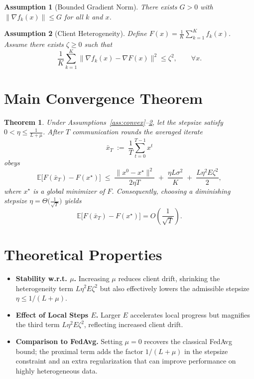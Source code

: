 \documentclass[11pt]{article}
\newtheorem{theorem}{Theorem}
\newtheorem{assumption}{Assumption}
\begin{document}
\begin{assumption}[Bounded Gradient Norm]\label{ass:boundgrad}
There exists $G>0$ with $\|\nabla f_k(x)\|\le G$ for all $k$ and $x$.
\end{assumption}

\begin{assumption}[Client Heterogeneity]\label{ass:hetero}
Define $F(x)=\frac{1}{K}\sum_{k=1}^{K}f_k(x)$. Assume there exists $\zeta\ge0$ such that
\[
    \frac{1}{K}\sum_{k=1}^{K}\|\nabla f_k(x)-\nabla F(x)\|^{2}\le\zeta^{2},\qquad\forall x.
\]
\end{assumption}

\section*{Main Convergence Theorem}
\begin{theorem}\label{thm:conv}
Under Assumptions~\ref{ass:convex}–\ref{ass:hetero}, let the stepsize satisfy $0<\eta\le\frac{1}{L+\mu}$. After $T$ communication rounds the averaged iterate
\[
    \bar{x}_{T}\;:=\;\frac{1}{T}\sum_{t=0}^{T-1}x^{t}
\]
obeys
\[
    \mathbb{E}\!\bigl[F(\bar{x}_{T})-F(x^{\star})\bigr]
    \;\le\;
    \frac{\|x^{0}-x^{\star}\|^{2}}{2\eta T}
    \;+\;
    \frac{\eta L\sigma^{2}}{K}
    \;+\;
    \frac{L\eta^{2}E\zeta^{2}}{2},
\]
where $x^{\star}$ is a global minimizer of $F$.
Consequently, choosing a diminishing stepsize $\eta=\Theta\!\bigl(\tfrac{1}{\sqrt{T}}\bigr)$ yields
\[
    \mathbb{E}\!\bigl[F(\bar{x}_{T})-F(x^{\star})\bigr]=
    O\!\left(\frac{1}{\sqrt{T}}\right).
\]
\end{theorem}

\section*{Theoretical Properties}
\begin{itemize}
    \item \textbf{Stability w.r.t. $\mu$.} Increasing $\mu$ reduces client drift, shrinking the heterogeneity term $L\eta^{2}E\zeta^{2}$ but also effectively lowers the admissible stepsize $\eta\le1/(L+\mu)$.
    \item \textbf{Effect of Local Steps $E$.} Larger $E$ accelerates local progress but magnifies the third term $L\eta^{2}E\zeta^{2}$, reflecting increased client drift.
    \item \textbf{Comparison to FedAvg.} Setting $\mu=0$ recovers the classical FedAvg bound; the proximal term adds the factor $1/(L+\mu)$ in the stepsize constraint and an extra regularization that can improve performance on highly heterogeneous data.
\end{itemize}
\end{document}
